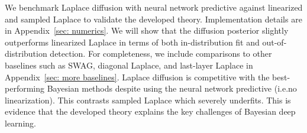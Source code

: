 \begin{table}
  \caption{Out-of-distribution \textsc{auroc}~($\uparrow$) performance for \textsc{mnist}, \textsc{fmnist} and .}
  \label{tab:ood}
  \setlength{\aboverulesep}{0pt}
  \setlength{\belowrulesep}{0pt}
  \setlength{\extrarowheight}{.75ex}
\end{table}

\renewcommand{\thefootnote}{}
\vspace{-3mm}

We benchmark Laplace diffusion with neural network predictive against linearized and sampled Laplace to validate the developed theory. Implementation details are in Appendix~\ref{sec: numerics}. We will show that the diffusion posterior slightly outperforms linearized Laplace in terms of both in-distribution fit and out-of-distribution detection. For completeness, we include comparisons to other baselines such as SWAG, diagonal Laplace, and last-layer Laplace in Appendix~\ref{sec: more baselines}. Laplace diffusion is competitive with the best-performing Bayesian methods despite using the neural network predictive (i.e.\@ no linearization). This contrasts sampled Laplace which severely underfits. 
This is evidence that the developed theory explains the key challenges of Bayesian deep learning.

